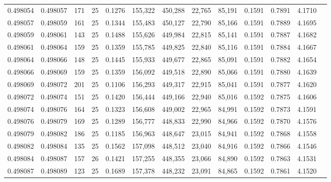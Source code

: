 \begin{tabular}{rrrrrrrrrrrrr}
0.498054 & 0.498057 & 171 &  25 &                                     0.1276 & 155,322 & 450,288 &  22,765 &  85,191 & 0.1591 & 0.7891 & 4.1710 \\
0.498057 & 0.498059 & 161 &  25 &                                     0.1344 & 155,483 & 450,127 &  22,790 &  85,166 & 0.1591 & 0.7889 & 4.1695 \\
0.498059 & 0.498061 & 143 &  25 &                                     0.1488 & 155,626 & 449,984 &  22,815 &  85,141 & 0.1591 & 0.7887 & 4.1682 \\
0.498061 & 0.498064 & 159 &  25 &                                     0.1359 & 155,785 & 449,825 &  22,840 &  85,116 & 0.1591 & 0.7884 & 4.1667 \\
0.498064 & 0.498066 & 148 &  25 &                                     0.1445 & 155,933 & 449,677 &  22,865 &  85,091 & 0.1591 & 0.7882 & 4.1654 \\
0.498066 & 0.498069 & 159 &  25 &                                     0.1359 & 156,092 & 449,518 &  22,890 &  85,066 & 0.1591 & 0.7880 & 4.1639 \\
0.498069 & 0.498072 & 201 &  25 &                                     0.1106 & 156,293 & 449,317 &  22,915 &  85,041 & 0.1591 & 0.7877 & 4.1620 \\
0.498072 & 0.498074 & 151 &  25 &                                     0.1420 & 156,444 & 449,166 &  22,940 &  85,016 & 0.1592 & 0.7875 & 4.1606 \\
0.498074 & 0.498076 & 164 &  25 &                                     0.1323 & 156,608 & 449,002 &  22,965 &  84,991 & 0.1592 & 0.7873 & 4.1591 \\
0.498076 & 0.498079 & 169 &  25 &                                     0.1289 & 156,777 & 448,833 &  22,990 &  84,966 & 0.1592 & 0.7870 & 4.1576 \\
0.498079 & 0.498082 & 186 &  25 &                                     0.1185 & 156,963 & 448,647 &  23,015 &  84,941 & 0.1592 & 0.7868 & 4.1558 \\
0.498082 & 0.498084 & 135 &  25 &                                     0.1562 & 157,098 & 448,512 &  23,040 &  84,916 & 0.1592 & 0.7866 & 4.1546 \\
0.498084 & 0.498087 & 157 &  26 &                                     0.1421 & 157,255 & 448,355 &  23,066 &  84,890 & 0.1592 & 0.7863 & 4.1531 \\
0.498087 & 0.498089 & 123 &  25 &                                     0.1689 & 157,378 & 448,232 &  23,091 &  84,865 & 0.1592 & 0.7861 & 4.1520 \\

\end{tabular}
